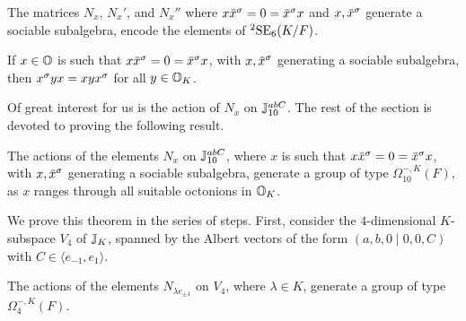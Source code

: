 \begin{proposition}
	The matrices $N_x$, $N_x'$, and $N_x''$ where $x\ovx^{\s} = 0 = \ovx^{\s}x$ and $x, \mathord{\mbox{\hspace*{0pt}}\,\overline{\!x\!\!\;}\!\:}\mbox{\hspace*{0pt}}^{\sigma}$
	generate a sociable subalgebra, encode the elements of ${}^2\mathrm{SE}_6(K/F)$. 
\end{proposition}

\begin{lemma}
	\label{lemma:sociable}
	If $x \in \mathbb{O}$ is such that $x \ovx^{\s} = 0 = \ovx^{\s} x$, with $x,\mathord{\mbox{\hspace*{0pt}}\,\overline{\!x\!\!\;}\!\:}\mbox{\hspace*{0pt}}^{\sigma}$ generating
	a sociable subalgebra, then $x^{\sigma} y x = x y x^{\sigma}$ for all $y \in \mathbb{O}_K$.  
\end{lemma}

Of great interest for us is the action of $N_x$ on $\mathbb{J}_{10}^{abC}$. The rest of the section
is devoted to proving the following result.

\begin{theorem}
	\label{theorem:3_nx_omega}
	The actions of the elements $N_x$ on $\mathbb{J}_{10}^{abC}$, where $x$ is such that 
	$x \ovx^{\s} = 0 = \ovx^{\s} x$, with $x,\mathord{\mbox{\hspace*{0pt}}\,\overline{\!x\!\!\;}\!\:}\mbox{\hspace*{0pt}}^{\sigma}$ generating a sociable subalgebra, 
	generate a group of type $\Omega_{10}^{-,K}(F)$, as $x$ ranges through all suitable octonions
	in $\mathbb{O}_K$.  
\end{theorem}

We prove this theorem in the series of steps. First, consider the $4$-dimensional 
$K$-subspace $V_4$ of $\mathbb{J}_K$, 
spanned by the Albert vectors of the form $(a,b,0\mid 0,0,C)$ with 
$C \in \langle e_{-1}, e_{1} \rangle$. 

\begin{lemma}
	The actions of the elements $N_{\lambda e_{ \pm 1 }}$ on $V_4$, where $\lambda \in K$, 
	generate a group of type $\Omega_4^{-,K}(F)$. 
\end{lemma}

